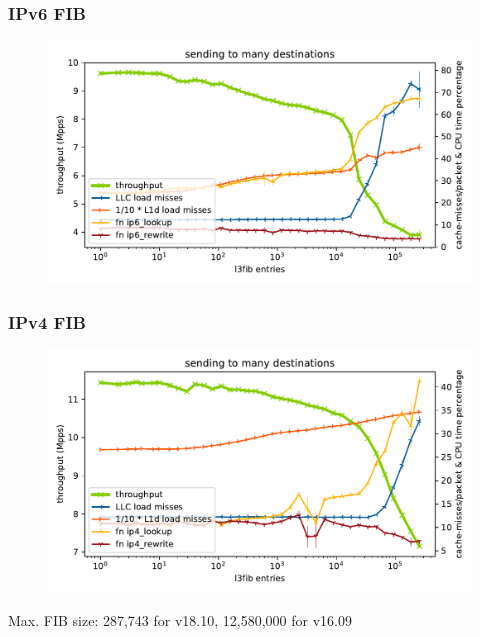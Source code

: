 \begin{frame}
    \frametitle{IPv6 FIB}
    \begin{figure}[!ht]
    \noindent\hspace{0.5mm}\includegraphics[width=\linewidth]{pics/throughput_l3v6_routes_klaipeda32ghz_v3.pdf}
    \label{graph:ip6fib}
    \end{figure}
\end{frame}

\begin{frame}
    \frametitle{IPv4 FIB}
    \begin{figure}[!ht]
    \noindent\hspace{0.5mm}\includegraphics[width=.85\linewidth]{pics/throughput_l3_routes_klaipeda32ghz_v3.pdf}
    \label{graph:ip4fib}
    \end{figure}
    \hspace{8mm} Max. FIB size: 287,743 for v18.10, 12,580,000 for v16.09
\end{frame}

